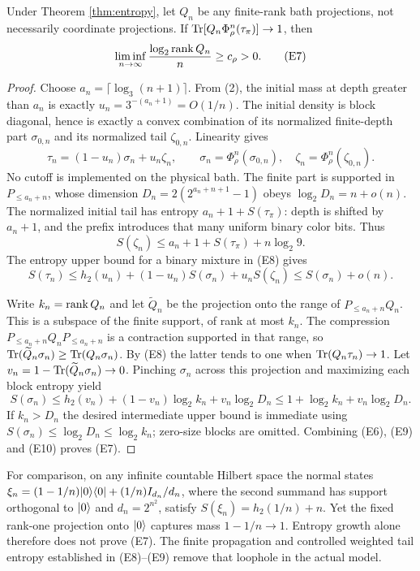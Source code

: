 \begin{theorem}
\label{thm:rank}
Under Theorem \ref{thm:entropy}, let $Q_n$ be any finite-rank bath
projections, not necessarily coordinate projections. If
$\operatorname{Tr}[Q_n\Phi_\rho^n(\tau_\pi)]\to1$, then
\[
 \liminf_{n\to\infty}\frac{\log_2\operatorname{rank} Q_n}{n}\ge c_\rho>0.
 \tag{E7}
\]
\end{theorem}
\begin{proof}
Choose $a_n=\lceil\log_3(n+1)\rceil$. From (2), the initial mass at
depth greater than $a_n$ is exactly
$u_n=3^{-(a_n+1)}=O(1/n)$. The initial density is block diagonal, hence
is exactly a convex combination of its normalized finite-depth part
$\sigma_{0,n}$ and its normalized tail $\zeta_{0,n}$. Linearity gives
\[
 \tau_n=(1-u_n)\sigma_n+u_n\zeta_n,
 \qquad
 \sigma_n=\Phi_\rho^n(\sigma_{0,n}),\quad
 \zeta_n=\Phi_\rho^n(\zeta_{0,n}).
 \tag{E8}
\]
No cutoff is implemented on the physical bath.
The finite part is supported in $P_{\le a_n+n}$, whose dimension
$D_n=2(2^{a_n+n+1}-1)$ obeys $\log_2D_n=n+o(n)$.
The normalized initial tail has entropy $a_n+1+S(\tau_\pi)$:
depth is shifted by $a_n+1$, and the prefix introduces that many
uniform binary color bits. Thus
\[
 S(\zeta_n)\le a_n+1+S(\tau_\pi)+n\log_2 9.
\]
The entropy upper bound for a binary mixture in (E8) gives
\[
 S(\tau_n)\le h_2(u_n)+(1-u_n)S(\sigma_n)+u_nS(\zeta_n)
 \le S(\sigma_n)+o(n).
 \tag{E9}
\]

Write $k_n=\operatorname{rank} Q_n$ and let $\widetilde Q_n$ be the projection onto
the range of $P_{\le a_n+n}Q_n$. This is a subspace of the finite
support, of rank at most $k_n$. The compression
$P_{\le a_n+n}Q_nP_{\le a_n+n}$ is a contraction supported in that
range, so $\operatorname{Tr}(\widetilde Q_n\sigma_n)\ge\operatorname{Tr}(Q_n\sigma_n)$.
By (E8) the latter tends to one when $\operatorname{Tr}(Q_n\tau_n)\to1$.
Let $v_n=1-\operatorname{Tr}(\widetilde Q_n\sigma_n)\to0$.
Pinching $\sigma_n$ across this projection and maximizing each block
entropy yield
\[
 S(\sigma_n)\le h_2(v_n)+(1-v_n)\log_2 k_n
                        +v_n\log_2D_n
 \le1+\log_2 k_n+v_n\log_2D_n.
 \tag{E10}
\]
If $k_n>D_n$ the desired intermediate upper bound is immediate using
$S(\sigma_n)\le\log_2D_n\le\log_2k_n$; zero-size blocks are omitted.
Combining (E6), (E9) and (E10) proves (E7).
\end{proof}

For comparison, on any infinite countable Hilbert space the normal states
$\xi_n=(1-1/n)\lvert 0\rangle\langle 0\rvert+(1/n)I_{d_n}/d_n$, where the second summand
has support orthogonal to $\lvert 0\rangle$ and $d_n=2^{n^2}$, satisfy
$S(\xi_n)=h_2(1/n)+n$. Yet the fixed rank-one projection onto
$\lvert 0\rangle$ captures mass $1-1/n\to1$. Entropy growth alone therefore
does not prove (E7). The finite propagation and controlled weighted tail
entropy established in (E8)--(E9) remove that loophole in the actual model.

